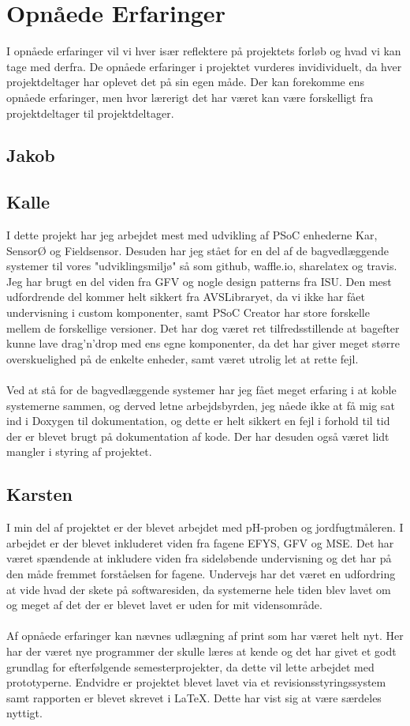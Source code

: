 \section{Opnåede Erfaringer}
I opnåede erfaringer vil vi hver især reflektere på projektets forløb og hvad vi kan tage med derfra. De opnåede erfaringer i projektet vurderes invidividuelt, da hver projektdeltager har oplevet det på sin egen måde. Der kan forekomme ens opnåede erfaringer, men hvor lærerigt det har været kan være forskelligt fra projektdeltager til projektdeltager.

\subsection{Jakob}

\subsection{Kalle}
I dette projekt har jeg arbejdet mest med udvikling af PSoC enhederne Kar, SensorØ og Fieldsensor. Desuden har jeg  stået for en del af de bagvedlæggende systemer til vores "udviklingsmiljø" så som github, waffle.io, sharelatex og travis. Jeg har brugt en del viden fra GFV og nogle design patterns fra ISU. Den mest udfordrende del kommer helt sikkert fra AVSLibraryet, da vi ikke har fået undervisning i custom komponenter, samt PSoC Creator har store forskelle mellem de forskellige versioner. Det har dog været ret tilfredsstillende at bagefter kunne lave drag'n'drop med ens egne komponenter, da det har giver meget større overskuelighed på de enkelte enheder, samt været utrolig let at rette fejl.\\\\
Ved at stå for de bagvedlæggende systemer har jeg fået meget erfaring i at koble systemerne sammen, og derved letne arbejdsbyrden, jeg nåede ikke at få mig sat ind i Doxygen til dokumentation, og dette er helt sikkert en fejl i forhold til tid der er blevet brugt på dokumentation af kode. Der har desuden også været lidt mangler i styring af projektet. 

\subsection{Karsten}
I min del af projektet er der blevet arbejdet med pH-proben og jordfugtmåleren. I arbejdet er der blevet inkluderet viden fra fagene EFYS, GFV og MSE. Det har været spændende at inkludere viden fra sideløbende undervisning og det har på den måde fremmet forståelsen for fagene. Undervejs har det været en udfordring at vide hvad der skete på softwaresiden, da systemerne hele tiden blev lavet om og meget af det der er blevet lavet er uden for mit vidensområde.
\\\\
Af opnåede erfaringer kan nævnes udlægning af print som har været helt nyt. Her har der været nye programmer der skulle læres at kende og det har givet et godt grundlag for efterfølgende semesterprojekter, da dette vil lette arbejdet med prototyperne. Endvidre er projektet blevet lavet via et revisionsstyringssystem samt rapporten er blevet skrevet i LaTeX. Dette har vist sig at være særdeles nyttigt. 
